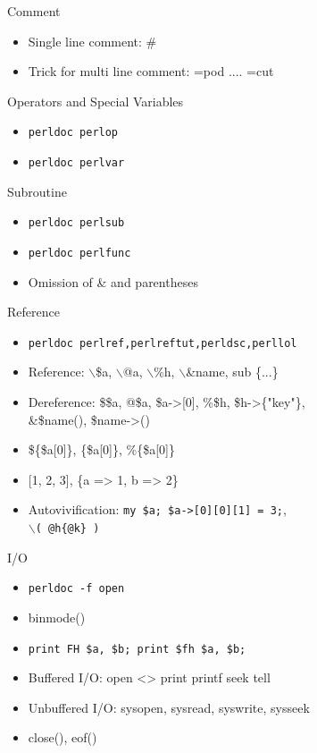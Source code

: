 \documentclass{beamer}
\begin{document}
\begin{frame}{Comment}
  \begin{itemize}
    \item Single line comment: \#
    \item Trick for multi line comment: =pod .... =cut
  \end{itemize}
\end{frame}

\begin{frame}{Operators and Special Variables}
  \begin{itemize}
    \item \texttt{perldoc perlop}
    \item \texttt{perldoc perlvar}
  \end{itemize}
\end{frame}

\begin{frame}{Subroutine}
  \begin{itemize}
    \item \texttt{perldoc perlsub}
    \item \texttt{perldoc perlfunc}
    \item Omission of \& and parentheses
  \end{itemize}
\end{frame}

\begin{frame}{Reference}
  \begin{itemize}
    \item \texttt{perldoc perlref,perlreftut,perldsc,perllol}
    \item Reference: $\backslash$\$a, $\backslash$@a, $\backslash$\%h, $\backslash$\&name, sub \{...\}
    \item Dereference: \$\$a, @\$a, \$a->[0], \%\$h, \$h->\{"key"\}, \\
          \&\$name(), \$name->()
    \item \$\{\$a[0]\}, \@\{\$a[0]\}, \%\{\$a[0]\}
    \item {}[1, 2, 3], \{a => 1, b => 2\}
    \item Autovivification: \texttt{my \$a; \$a->[0][0][1] = 3;}, \\
          \texttt{$\backslash$( @h\{@k\} )}
  \end{itemize}
\end{frame}

\begin{frame}{I/O}
  \begin{itemize}
    \item \texttt{perldoc -f open}
    \item binmode()
    \item \texttt{print FH \$a, \$b; print \$fh \$a, \$b;}
    \item Buffered I/O: open <> print printf seek tell
    \item Unbuffered I/O: sysopen, sysread, syswrite, sysseek
    \item close(), eof()
  \end{itemize}
\end{frame}
\end{document}
